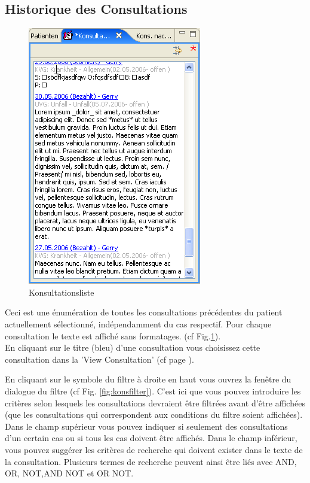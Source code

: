 \clearpage

\subsection{Historique des Consultations}
\label{view:konsultationen}
\begin{figure}
  \includegraphics{images/konslisteview}
  \caption{Konsultationsliste}
  \label{fig:konslisteview}
\end{figure}

Ceci est une énumération de toutes les consultations précédentes du patient actuellement sélectionné, indépendamment du cas respectif.
 Pour chaque consultation le texte est affiché sans formatages. (cf Fig.\ref{fig:konslisteview}).\\
En cliquant sur le titre (bleu) d'une consultation vous choisissez cette consultation dans la 'View Consultation' (cf page \pageref{konsview}).

En cliquant sur le symbole du filtre à droite en haut vous ouvrez la fenêtre du dialogue du filtre (cf Fig. \ref{fig:konsfilter}).
 C'est ici que vous pouvez introduire les critères selon lesquels les consultations devraient être filtrées avant d'être affichées (que les consultations qui correspondent aux conditions du filtre soient affichées).
Dans le champ supérieur vous pouvez indiquer si seulement des consultations d'un certain cas ou si tous les cas doivent être affichés. Dans le champ  inférieur, vous pouvez suggérer les critères de recherche qui doivent exister dans le texte de la consultation. Plusieurs termes de recherche peuvent ainsi être liés avec AND, OR, NOT,AND NOT et OR NOT.

